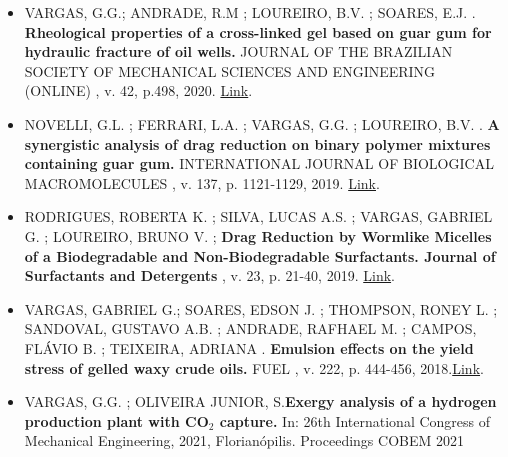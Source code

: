 \documentclass[10pt,a4paper,ragged2e,withhyper]{altacv}
\begin{document}
\begin{paracol}{2}
            \begin{itemize}
                \item VARGAS, G.G.; ANDRADE, R.M ; LOUREIRO, B.V. ; SOARES, E.J. . \textbf{Rheological properties of a cross-linked gel based on guar gum for hydraulic fracture of oil wells.} JOURNAL OF THE BRAZILIAN SOCIETY OF MECHANICAL SCIENCES AND ENGINEERING (ONLINE) , v. 42, p.498, 2020. \href{http://dx.doi.org/10.1007/s40430-020-02579-w}{Link}.
                
                \divider
                
                \item NOVELLI, G.L. ; FERRARI, L.A. ; VARGAS, G.G. ; LOUREIRO, B.V. . \textbf{A synergistic analysis of drag reduction on binary polymer mixtures containing guar gum.} INTERNATIONAL JOURNAL OF BIOLOGICAL MACROMOLECULES , v. 137, p. 1121-1129, 2019. \href{http://dx.doi.org/10.1016/j.ijbiomac.2019.07.042}{Link}.
                
                \divider
                
                \item RODRIGUES, ROBERTA K. ; SILVA, LUCAS A.S. ; VARGAS, GABRIEL G. ; LOUREIRO, BRUNO V. ; \textbf{Drag Reduction by Wormlike Micelles of a Biodegradable and Non-Biodegradable Surfactants. Journal of Surfactants and Detergents} , v. 23, p. 21-40, 2019. \href{http://dx.doi.org/10.1002/jsde.12354}{Link}.
                
                \divider
                
                \item VARGAS, GABRIEL G.; SOARES, EDSON J. ; THOMPSON, RONEY L. ; SANDOVAL, GUSTAVO A.B. ; ANDRADE, RAFHAEL M. ; CAMPOS, FLÁVIO B. ; TEIXEIRA, ADRIANA . \textbf{Emulsion effects on the yield stress of gelled waxy crude oils.} FUEL , v. 222, p. 444-456, 2018.\href{http://dx.doi.org/10.1016/j.fuel.2018.01.105}{Link}.
            \end{itemize}

        
            \begin{itemize}
                \item VARGAS, G.G. ; OLIVEIRA JUNIOR, S.\textbf{Exergy analysis of a hydrogen production plant with CO$_{2}$ capture.} In: 26th International Congress of Mechanical Engineering, 2021, Florianópilis. Proceedings COBEM 2021
                

\end{itemize}
\end{paracol}
\end{document}
